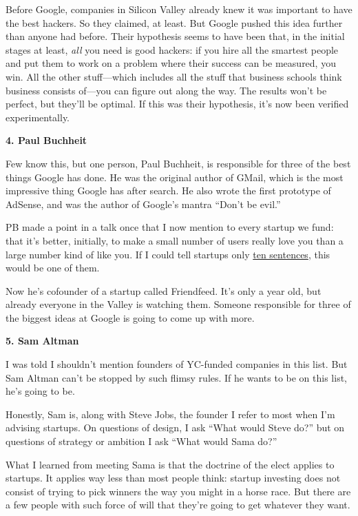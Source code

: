 Before Google, companies in Silicon Valley already knew it was important
to have the best hackers. So they claimed, at least. But Google pushed
this idea further than anyone had before. Their hypothesis seems to have
been that, in the initial stages at least, \emph{all} you need is good
hackers: if you hire all the smartest people and put them to work on a
problem where their success can be measured, you win. All the other
stuff---which includes all the stuff that business schools think
business consists of---you can figure out along the way. The results
won't be perfect, but they'll be optimal. If this was their hypothesis,
it's now been verified experimentally.

\textbf{4. Paul Buchheit}

Few know this, but one person, Paul Buchheit, is responsible for three
of the best things Google has done. He was the original author of GMail,
which is the most impressive thing Google has after search. He also
wrote the first prototype of AdSense, and was the author of Google's
mantra ``Don't be evil.''

PB made a point in a talk once that I now mention to every startup we
fund: that it's better, initially, to make a small number of users
really love you than a large number kind of like you. If I could tell
startups only \href{13sentences.html}{ten sentences}, this would be one
of them.

Now he's cofounder of a startup called Friendfeed. It's only a year old,
but already everyone in the Valley is watching them. Someone responsible
for three of the biggest ideas at Google is going to come up with more.

\textbf{5. Sam Altman}

I was told I shouldn't mention founders of YC-funded companies in this
list. But Sam Altman can't be stopped by such flimsy rules. If he wants
to be on this list, he's going to be.

Honestly, Sam is, along with Steve Jobs, the founder I refer to most
when I'm advising startups. On questions of design, I ask ``What would
Steve do?'' but on questions of strategy or ambition I ask ``What would
Sama do?''

What I learned from meeting Sama is that the doctrine of the elect
applies to startups. It applies way less than most people think: startup
investing does not consist of trying to pick winners the way you might
in a horse race. But there are a few people with such force of will that
they're going to get whatever they want.